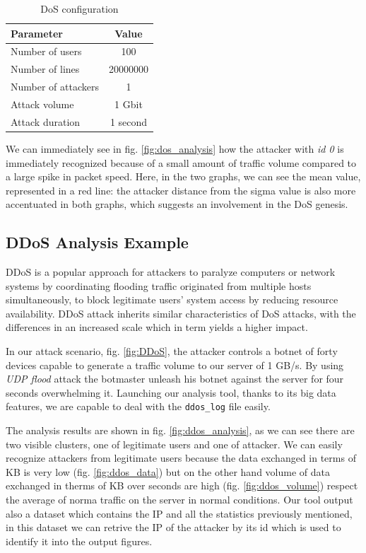 \begin{table}[h]
\centering
\begin{tabular}{|l|c|}
\hline
\textbf{Parameter} & \textbf{Value} \\ \hline
 Number of users & 100 \\ 
 Number of lines & 20000000 \\ 
 Number of attackers & 1 \\ 
 Attack volume & 1 Gbit \\
 Attack duration & 1 second \\  
 \hline 
\end{tabular}
\caption{DoS configuration}
\label{tab:tab:dos_config}
\end{table}

We can immediately see in fig. \ref{fig:dos_analysis} how the attacker with \textit{id 0} is immediately recognized because of a small amount of traffic volume compared to a large spike in packet speed. Here, in the two graphs, we can see the mean value, represented in a red line: the attacker distance from the sigma value is also more accentuated in both graphs, which suggests an involvement in the DoS genesis.

\subsection{DDoS Analysis Example}
DDoS is a popular approach for attackers to paralyze computers or network systems by coordinating flooding traffic originated from multiple hosts simultaneously, to block legitimate users' system access by reducing resource availability. DDoS attack inherits similar characteristics of DoS attacks, with the differences in an increased scale which in term yields a higher impact\cite{ddos_forensics}.

In our attack scenario, fig. \ref{fig:DDoS},  the attacker controls a botnet of forty devices capable to generate a traffic volume to our server of 1 GB/s. By using \textit{UDP flood} attack the botmaster unleash his botnet against the server for four seconds overwhelming it. Launching our analysis tool, thanks to its big data features, we are capable to deal with the \texttt{ddos\_log} file easily.

The analysis results are shown in fig. \ref{fig:ddos_analysis}, as we can see there are two  visible clusters, one of legitimate users and one of attacker. We can easily recognize attackers from legitimate users because the data exchanged in terms of KB is very low (fig. \ref{fig:ddos_data}) but on the other hand volume of data exchanged in therms of KB over seconds are high (fig. \ref{fig:ddos_volume}) respect the average of norma traffic on the server in normal conditions. 
Our tool output also a dataset which contains the IP and all the statistics previously mentioned, in this dataset we can retrive the IP of the attacker by its id which is used to identify it into the output figures. 
